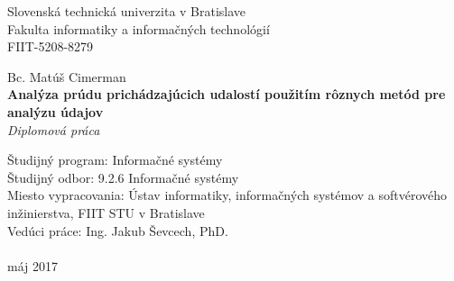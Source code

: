 \documentclass[12pt, a4paper, titlepage, slovak]{book}
\begin{document}
\begin{titlepage}
\begin{center}                                                                                                                                                   
{\Large Slovenská technická univerzita v Bratislave} \\
{\Large Fakulta informatiky a informačných technológií} \\
\vspace*{1\baselineskip}
\large {FIIT-5208-8279}
\vfill %


{{Bc. Matúš Cimerman}} \\
\vspace*{1\baselineskip}
{\LARGE {\textbf{Analýza prúdu prichádzajúcich udalostí použitím rôznych metód pre analýzu údajov}}} %
\\
\vspace*{1\baselineskip}
\textit{Diplomová práca}\\
\vfill %
\end{center}
{Študijný program: Informačné systémy}\\
{Študijný odbor: 9.2.6 Informačné systémy}\\
{Miesto vypracovania: Ústav informatiky, informačných systémov a softvérového inžinierstva, FIIT STU v Bratislave}\\
{Vedúci práce: Ing. Jakub Ševcech, PhD.}\\
\\
{máj 2017}

\end{titlepage}
\restoregeometry
\thispagestyle{empty}
\emptydoublepage

%

%
%

%



\emptydoublepage


\emptydoublepage
\end{document}
